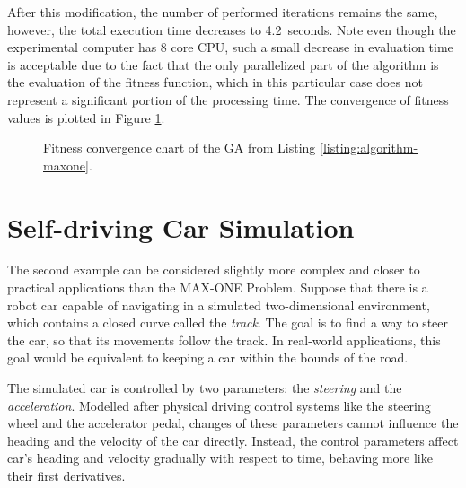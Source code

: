 After this modification, the number of performed iterations remains the same, however, the total execution time decreases to 4.2~seconds. Note even though the experimental computer has 8 core CPU, such a small decrease in evaluation time is acceptable due to the fact that the only parallelized part of the algorithm is the evaluation of the fitness function, which in this particular case does not represent a significant portion of the processing time. The convergence of fitness values is plotted in Figure \ref{fig:maxone-fitness}.

\begin{figure}[ht]
	\centering
	\caption[MAX-ONE genetic algorithm fitness convergence chart.]{Fitness convergence chart of the GA from Listing \ref{listing:algorithm-maxone}.}
	\label{fig:maxone-fitness}
\end{figure}

\section{Self-driving Car Simulation}
The second example can be considered slightly more complex and closer to practical applications than the MAX-ONE Problem. Suppose that there is a robot car capable of navigating in a simulated two-dimensional environment, which contains a closed curve called the \textit{track}. The goal is to find a way to steer the car, so that its movements follow the track. In real-world applications, this goal would be equivalent to keeping a car within the bounds of the road.

The simulated car is controlled by two parameters: the \textit{steering} and the \textit{acceleration}. Modelled after physical driving control systems like the steering wheel and the accelerator pedal, changes of these parameters cannot influence the heading and the velocity of the car directly. Instead, the control parameters affect car's heading and velocity gradually with respect to time, behaving more like their first derivatives.

